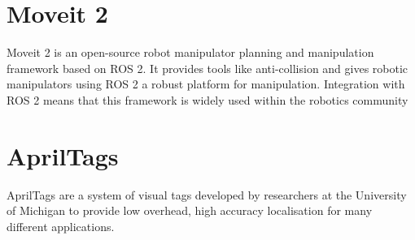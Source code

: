 \section{Moveit 2}
Moveit 2 is an open-source robot manipulator planning and manipulation framework based on ROS 2. It provides tools like anti-collision and gives robotic manipulators using  ROS 2 a robust platform for manipulation. Integration with ROS 2 means that this framework is widely used within the robotics community

\section{AprilTags}
AprilTags are a system of visual tags developed by researchers at the University of Michigan to provide low overhead, high accuracy localisation for many different applications. 

